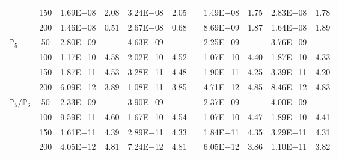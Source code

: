 \begin{table}[H]
{\begin{tabular}{@{}l c c c c c c c c c c@{}}
 & 150 & 1.69E$-$08 & 2.08  & 3.24E$-$08 & 2.05 &  & 1.49E$-$08 & 1.75 & 2.83E$-$08 & 1.78\\
 & 200 & 1.46E$-$08 & 0.51  & 2.67E$-$08 & 0.68 &  & 8.69E$-$09 & 1.87 & 1.64E$-$08 & 1.89\\
\midrule
\multirow{4}{*}{$\mathbb{P}_{5}$}
 & 50 & 2.80E$-$09 & ---  & 4.63E$-$09 & --- &  & 2.25E$-$09 & --- & 3.76E$-$09 & ---\\
 & 100 & 1.17E$-$10 & 4.58  & 2.02E$-$10 & 4.52 &  & 1.07E$-$10 & 4.40 & 1.87E$-$10 & 4.33\\
 & 150 & 1.87E$-$11 & 4.53  & 3.28E$-$11 & 4.48 &  & 1.90E$-$11 & 4.25 & 3.39E$-$11 & 4.20\\
 & 200 & 6.09E$-$12 & 3.89  & 1.08E$-$11 & 3.85 &  & 4.71E$-$12 & 4.85 & 8.46E$-$12 & 4.83\\
\midrule
\multirow{4}{*}{$\mathbb{P}_{5}/\mathbb{P}_{6}$}
 & 50 & 2.33E$-$09 & ---  & 3.90E$-$09 & --- &  & 2.37E$-$09 & --- & 4.00E$-$09 & ---\\
 & 100 & 9.59E$-$11 & 4.60  & 1.67E$-$10 & 4.54 &  & 1.07E$-$10 & 4.47 & 1.89E$-$10 & 4.41\\
 & 150 & 1.61E$-$11 & 4.39  & 2.89E$-$11 & 4.33 &  & 1.84E$-$11 & 4.35 & 3.29E$-$11 & 4.31\\
 & 200 & 4.05E$-$12 & 4.81  & 7.24E$-$12 & 4.81 &  & 6.05E$-$12 & 3.86 & 1.10E$-$11 & 3.82\\
\bottomrule
\end{tabular}}
\label{none}
\end{table}
